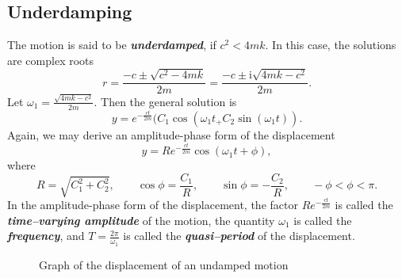 \subsection*{Underdamping} 

The motion is said to be \emph{\textbf{underdamped}}, if $c^2<4mk$. In this case, the solutions are complex roots 
\[r=\frac{-c\pm\sqrt{c^2-4mk}}{2m}=\frac{-c\pm\mathrm{i}\sqrt{4mk-c^2}}{2m}.\] 
Let $\omega_1=\frac{\sqrt{4mk-c^2}}{2m}$. Then the general solution is
\[y=e^{-\frac{ct}{2m}}(C_1\cos(\omega_1 t_+C_2\sin(\omega_1 t)).\]
Again, we may derive an amplitude-phase form of the displacement
\[y=Re^{-\frac{ct}{2m}}\cos(\omega_1 t +\phi),\]
where
\[R=\sqrt{C_1^2+C_2^2},\qquad \cos\phi=\frac{C_1}{R},\qquad \sin\phi=-\frac{C_2}{R},\qquad -\phi<\phi<\pi.\]
In the amplitude-phase form of the displacement, the factor $Re^{-\frac{ct}{2m}}$ is called the \emph{\textbf{time–varying amplitude}} of the motion, the quantity $\omega_1$ is called the \emph{\textbf{frequency}}, and $T=\frac{2\pi}{\omega_1}$ is called the \emph{\textbf{quasi–period}} of the displacement.

\begin{figure}[htb]
  \centering
\caption[Undamped motion]{Graph of the displacement of an undamped motion}
\end{figure}

